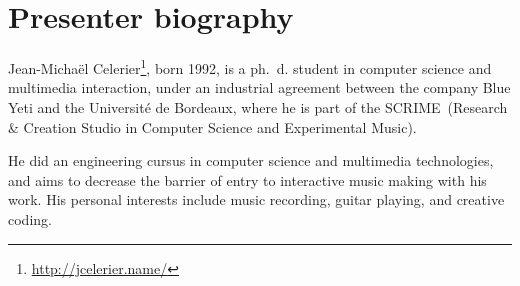 \documentclass[11pt]{article}
\begin{document}
\section*{Presenter biography}
Jean-Michaël Celerier\footnote{\url{http://jcelerier.name/}}, born 1992, is a ph.~d. student in computer science and multimedia interaction, under an industrial agreement between the company Blue Yeti and the Université de Bordeaux, where he is part of the SCRIME~(Research \& Creation Studio in Computer Science and Experimental Music).

He did an engineering cursus in computer science and multimedia technologies, and aims to decrease the barrier of entry to interactive music making with his work. His personal interests include music recording, guitar playing, and creative coding. 

\nocite{baltazar_i-score_2014}
\nocite{de2016presentation}
\nocite{celerier2015ossia}
\nocite{celerier2016outils}

\printbibliography
\end{document}
